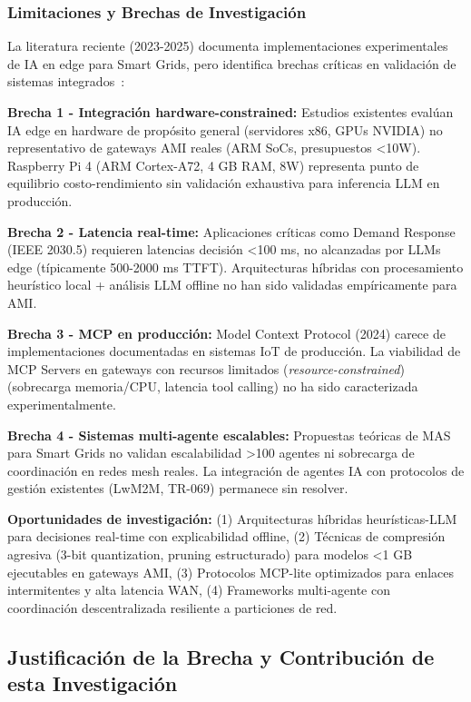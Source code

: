 \subsubsection{Limitaciones y Brechas de Investigación}
\label{sec:marco-estado-ia-limitaciones}

La literatura reciente (2023-2025) documenta implementaciones experimentales de IA en edge para Smart Grids, pero identifica brechas críticas en validación de sistemas integrados~\cite{ayaUnleashingIntelligenceEdge2024,huangDataProcessingEnhancement2025}:

\textbf{Brecha 1 - Integración hardware-constrained:} Estudios existentes evalúan IA edge en hardware de propósito general (servidores x86, GPUs NVIDIA) no representativo de gateways AMI reales (ARM SoCs, presupuestos <10W). Raspberry Pi 4 (ARM Cortex-A72, 4 GB RAM, 8W) representa punto de equilibrio costo-rendimiento sin validación exhaustiva para inferencia LLM en producción.

\textbf{Brecha 2 - Latencia real-time:} Aplicaciones críticas como Demand Response (IEEE 2030.5) requieren latencias decisión <100 ms, no alcanzadas por LLMs edge (típicamente 500-2000 ms TTFT). Arquitecturas híbridas con procesamiento heurístico local + análisis LLM offline no han sido validadas empíricamente para AMI.

\textbf{Brecha 3 - MCP en producción:} Model Context Protocol (2024) carece de implementaciones documentadas en sistemas IoT de producción. La viabilidad de MCP Servers en gateways con recursos limitados (\textit{resource-constrained}) (sobrecarga memoria/CPU, latencia tool calling) no ha sido caracterizada experimentalmente.

\textbf{Brecha 4 - Sistemas multi-agente escalables:} Propuestas teóricas de MAS para Smart Grids no validan escalabilidad >100 agentes ni sobrecarga de coordinación en redes mesh reales. La integración de agentes IA con protocolos de gestión existentes (LwM2M, TR-069) permanece sin resolver.

\textbf{Oportunidades de investigación:} (1) Arquitecturas híbridas heurísticas-LLM para decisiones real-time con explicabilidad offline, (2) Técnicas de compresión agresiva (3-bit quantization, pruning estructurado) para modelos <1 GB ejecutables en gateways AMI, (3) Protocolos MCP-lite optimizados para enlaces intermitentes y alta latencia WAN, (4) Frameworks multi-agente con coordinación descentralizada resiliente a particiones de red.

\subsection{Justificación de la Brecha y Contribución de esta Investigación}
\label{sec:marco-estado-brecha}

